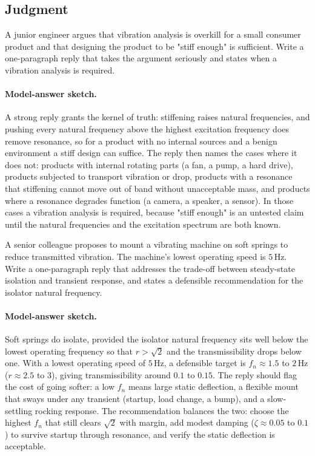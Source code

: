 \subsection*{Judgment}

\begin{exercise}
A junior engineer argues that vibration analysis is overkill for a
small consumer product and that designing the product to be "stiff
enough" is sufficient. Write a one-paragraph reply that takes the
argument seriously and states when a vibration analysis is required.

\paragraph{Model-answer sketch.} A strong reply grants the kernel of
truth: stiffening raises natural frequencies, and pushing every
natural frequency above the highest excitation frequency does remove
resonance, so for a product with no internal sources and a benign
environment a stiff design can suffice. The reply then names the cases
where it does not: products with internal rotating parts (a fan, a
pump, a hard drive), products subjected to transport vibration or
drop, products with a resonance that stiffening cannot move out of
band without unacceptable mass, and products where a resonance
degrades function (a camera, a speaker, a sensor). In those cases a
vibration analysis is required, because "stiff enough" is an untested
claim until the natural frequencies and the excitation spectrum are
both known.
\end{exercise}

\begin{exercise}
A senior colleague proposes to mount a vibrating machine on
soft springs to reduce transmitted vibration. The machine's lowest
operating speed is $5\,\si{\hertz}$. Write a one-paragraph reply
that addresses the trade-off between steady-state isolation and
transient response, and states a defensible recommendation for the
isolator natural frequency.

\paragraph{Model-answer sketch.} Soft springs do isolate, provided the
isolator natural frequency sits well below the lowest operating
frequency so that $r > \sqrt2$ and the transmissibility drops below
one. With a lowest operating speed of $5\,\si{\hertz}$, a defensible
target is $f_n \approx 1.5$ to $2\,\si{\hertz}$ ($r \approx 2.5$ to
$3$), giving transmissibility around $0.1$ to $0.15$. The reply should
flag the cost of going softer: a low $f_n$ means large static
deflection, a flexible mount that sways under any transient (startup,
load change, a bump), and a slow-settling rocking response. The
recommendation balances the two: choose the highest $f_n$ that still
clears $\sqrt2$ with margin, add modest damping ($\zeta \approx 0.05$
to $0.1$) to survive startup through resonance, and verify the static
deflection is acceptable.
\end{exercise}

